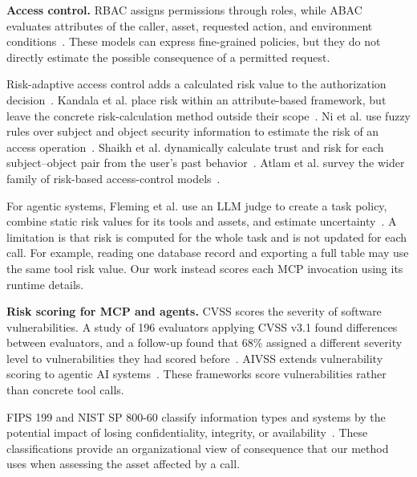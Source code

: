\documentclass[sigconf]{acmart}
\begin{document}
\textbf{Access control.}
RBAC assigns permissions through roles, while ABAC evaluates attributes of the
caller, asset, requested action, and environment
conditions~\cite{sandhu1996rbac,hu2014abac}. These models can express
fine-grained policies, but they do not directly estimate the possible
consequence of a permitted request.

Risk-adaptive access control adds a calculated risk value to the authorization
decision~\cite{cheng2007fuzzymls}. Kandala et al. place risk within an
attribute-based framework, but leave the concrete risk-calculation method
outside their scope~\cite{kandala2011radac}. Ni et al. use fuzzy rules over
subject and object security information to estimate the risk of an access
operation~\cite{ni2010fuzzy}. Shaikh et al. dynamically calculate trust and
risk for each subject--object pair from the user's past
behavior~\cite{shaikh2012dynamic}. Atlam et al. survey the wider family of
risk-based access-control models~\cite{atlam2020riskbased}.

For agentic systems, Fleming et al. use an LLM judge to create a task policy,
combine static risk values for its tools and assets, and estimate
uncertainty~\cite{fleming2025tbac}. A limitation is that risk is computed for
the whole task and is not updated for each call. For example, reading one
database record and exporting a full table may use the same tool risk value.
Our work instead scores each MCP invocation using its runtime details.

\textbf{Risk scoring for MCP and agents.}
CVSS scores the severity of software vulnerabilities. A study of 196 evaluators
applying CVSS v3.1 found differences between evaluators, and a follow-up found
that 68\% assigned a different severity level to vulnerabilities they had
scored before~\cite{first2023cvss,wunder2024cvss}. AIVSS extends vulnerability
scoring to agentic AI systems~\cite{huang2026aivss}. These frameworks score
vulnerabilities rather than concrete tool calls.

FIPS 199 and NIST SP 800-60 classify information types and systems by the
potential impact of losing confidentiality, integrity, or
availability~\cite{nist2004fips199,nist2008sp80060}. These classifications
provide an organizational view of consequence that our method uses when
assessing the asset affected by a call.
\end{document}
